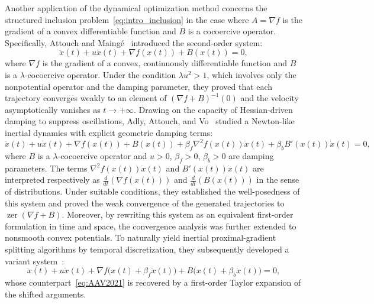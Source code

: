 \documentclass{article}
\theoremstyle{definition}
\theoremstyle{definition}
\theoremstyle{definition}
\begin{document}
Another application of the dynamical optimization method concerns the structured inclusion problem~\eqref{eq:intro_inclusion} in the case where $A=\nabla f$ is the gradient of a convex differentiable function and $B$ is a cocoercive operator. Specifically, Attouch and Maing\'{e}~\cite{attouch2011asymptotic} introduced the second-order system:
\begin{equation*}\label{eq:AM2011}
\ddot{x}(t)+u\dot{x}(t)+\nabla f(x(t))+B(x(t))=0,
\end{equation*}
where $\nabla f$ is the gradient of a convex, continuously differentiable function and $B$ is a $\lambda$-cocoercive operator. Under the condition $\lambda u^{2}>1$, which involves only the nonpotential operator and the damping parameter, they proved that each trajectory converges weakly to an element of $(\nabla f+B)^{-1}(0)$ and the velocity asymptotically vanishes as $t\to+\infty$.
Drawing on the capacity of Hessian-driven damping to suppress oscillations, Adly, Attouch, and Vo~\cite{adly2021asymptotic} studied a Newton-like inertial dynamics with explicit geometric damping terms:
\begin{equation}\label{eq:AAV2021}
\ddot{x}(t)+u\dot{x}(t)+\nabla f(x(t))+B(x(t))+\beta_{f}\nabla^{2}f(x(t))\dot{x}(t)+\beta_{b}B'(x(t))\dot{x}(t)=0,
\end{equation}
where $B$ is a $\lambda$-cocoercive operator and $u>0$, $\beta_{f}>0$, $\beta_{b}>0$ are damping parameters. The terms $\nabla^{2}f(x(t))\dot{x}(t)$ and $B'(x(t))\dot{x}(t)$ are interpreted respectively as $\frac{d}{dt}(\nabla f(x(t)))$ and $\frac{d}{dt}(B(x(t)))$ in the sense of distributions. Under suitable conditions, they established the well-posedness of this system and proved the weak convergence of the generated trajectories to $\operatorname{zer}(\nabla f+B)$. Moreover, by rewriting this system as an equivalent first-order formulation in time and space, the convergence analysis was further extended to nonsmooth convex potentials.
To naturally yield inertial proximal-gradient splitting algorithms by temporal discretization, they subsequently developed a variant system~\cite{adly2023convergence}:
\begin{equation*}
\label{eq:AAV2023}
\ddot{x}(t)+u\dot{x}(t)+\nabla f\bigl(x(t)+\beta_{f}\dot{x}(t)\bigr)+B\bigl(x(t)+\beta_{b}\dot{x}(t)\bigr)=0,
\end{equation*}
whose counterpart~\eqref{eq:AAV2021} is recovered by a first-order Taylor expansion of the shifted arguments.
\end{document}
